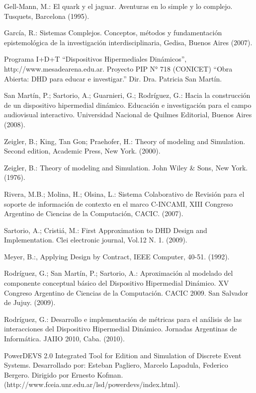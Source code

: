 \begin{thebibliography}{1}
{\bibitem{}
Gell-Mann, M.: El quark y el jaguar. Aventuras en lo simple y lo complejo.
Tusquets, Barcelona (1995).


\bibitem{}
García, R.: Sistemas Complejos. Conceptos, métodos y fundamentación
epistemológica de la investigación interdisciplinaria, Gedisa, Buenos
Aires (2007).

\bibitem{}
Programa I+D+T “Dispositivos Hipermediales Dinámicos”,
http://www.mesadearena.edu.ar. Proyecto PIP N° 718 (CONICET) “Obra Abierta: DHD
para educar e investigar.” Dir. Dra. Patricia San Martín.


\bibitem{}
San Martín, P.; Sartorio, A.; Guarnieri, G.; Rodríguez, G.: Hacia
la construcción de un dispositivo hipermedial dinámico. Educación e
investigación para el campo audiovisual interactivo. Universidad Nacional de
Quilmes Editorial, Buenos Aires (2008).


\bibitem{}
Zeigler, B.; King, Tan Gon; Praehofer, H.: Theory of modeling and
Simulation. Second edition, Academic Press, New York. (2000).


\bibitem{}
Zeigler, B.: Theory of modeling and Simulation. John Wiley & Sons, New
York. (1976).

\bibitem{}
Rivera, M.B.; Molina, H.; Olsina, L.: Sistema Colaborativo de
Revisión para el soporte de información de contexto en el marco C-INCAMI, XIII
Congreso Argentino de Ciencias de la Computación, CACIC. (2007).

\bibitem{}
Sartorio, A.; Cristiá, M.: First Approximation to DHD Design and
Implementation. Clei electronic journal, Vol.12 N. 1. (2009).

\bibitem{}
Meyer, B.:, Applying Design by Contract, IEEE Computer, 40-51. (1992).

\bibitem{}
Rodríguez, G.; San Martín, P.; Sartorio, A.: Aproximación al modelado
del componente conceptual básico del Dispositivo Hipermedial Dinámico.  XV
Congreso Argentino de Ciencias de la Computación. CACIC 2009. San Salvador de
Jujuy. (2009).


\bibitem{}
Rodríguez, G.: Desarrollo e implementación de métricas para el
análisis de las interacciones del Dispositivo Hipermedial Dinámico. Jornadas
Argentinas de Informática. JAIIO 2010, Caba. (2010).

\bibitem{}
PowerDEVS 2.0 Integrated Tool for Edition and Simulation of Discrete
Event Systems. Desarrollado por: Esteban Pagliero, Marcelo Lapadula, Federico
Bergero. Dirigido por Ernesto
Kofman. (http://www.fceia.unr.edu.ar/lsd/powerdevs/index.html).

}
\end{thebibliography}
